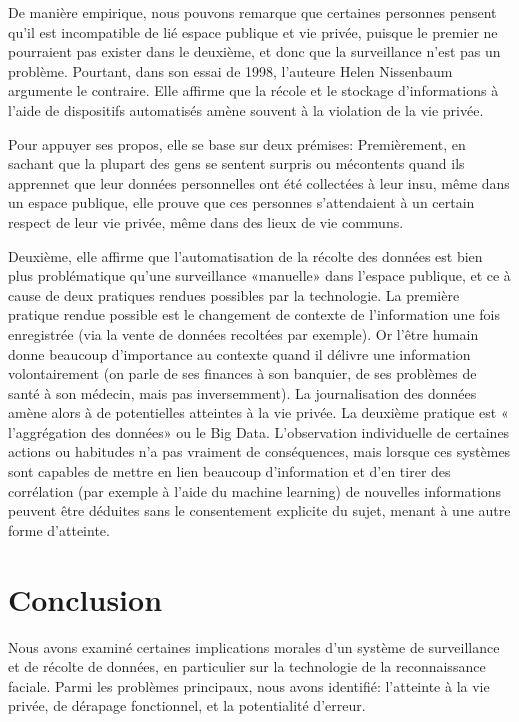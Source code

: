 De manière empirique, nous pouvons remarque que certaines personnes pensent qu’il est incompatible de lié
espace publique et vie privée, puisque le premier ne pourraient pas exister dans le deuxième, et donc que la
surveillance n’est pas un problème. Pourtant, dans son essai de 1998, l’auteure Helen Nissenbaum argumente le
contraire. Elle affirme que la récole et le stockage d’informations à l’aide de dispositifs automatisés amène souvent
à la violation de la vie privée.

Pour appuyer ses propos, elle se base sur deux prémises:
Premièrement, en sachant que la plupart des gens se sentent surpris ou mécontents quand ils apprennet que leur
données personnelles ont été collectées à leur insu, même dans un espace publique, elle prouve que ces personnes
s’attendaient à un certain respect de leur vie privée, même dans des lieux de vie communs.

Deuxième, elle affirme que l’automatisation de la récolte des données est bien plus problématique qu’une
surveillance «manuelle» dans l’espace publique, et ce à cause de deux pratiques rendues possibles par la
technologie. La première pratique rendue possible est le changement de contexte de l’information une fois
enregistrée (via la vente de données recoltées par exemple). Or l’être humain donne beaucoup d’importance au
contexte quand il délivre une information volontairement (on parle de ses finances à son banquier, de ses
problèmes de santé à son médecin, mais pas inversemment). La journalisation des données amène alors à de
potentielles atteintes à la vie privée. La deuxième pratique est « l’aggrégation des données» ou le Big Data.
L’observation individuelle de certaines actions ou habitudes n’a pas vraiment de conséquences, mais lorsque ces
systèmes sont capables de mettre en lien beaucoup d’information et d’en tirer des corrélation (par exemple à l’aide
du machine learning) de nouvelles informations peuvent être déduites sans le consentement explicite du sujet,
menant à une autre forme d’atteinte.

\section{Conclusion}
Nous avons examiné certaines implications morales d’un système de surveillance et de récolte de données, en
particulier sur la technologie de la reconnaissance faciale. Parmi les problèmes principaux, nous avons identifié:
l’atteinte à la vie privée, de dérapage fonctionnel, et la potentialité d’erreur.

